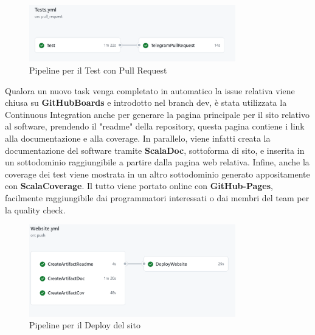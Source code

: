         \begin{figure}[H]
            \caption{Pipeline per il Test con Pull Request}
            \label{fig:CI-Test-PR}
            \centering
            \includegraphics[width=0.8\textwidth]{Images/CI-Test-PR.png}
        \end{figure}

        Qualora un nuovo task venga completato in automatico la issue relativa viene chiusa su \textbf{GitHubBoards} e introdotto nel branch dev, è stata utilizzata la Continuous Integration anche per generare la pagina principale per il sito relativo al software, prendendo il "readme" della repository, questa pagina contiene i link alla documentazione e alla coverage. In parallelo, viene infatti creata la documentazione del software tramite \textbf{ScalaDoc}, sottoforma di sito, e inserita in un sottodominio raggiungibile a partire dalla pagina web relativa. Infine, anche la coverage dei test viene mostrata in un altro sottodominio generato appositamente con \textbf{ScalaCoverage}. Il tutto viene portato online con \textbf{GitHub-Pages}, facilmente raggiungibile dai programmatori interessati o dai membri del team per la quality check.
        \begin{figure}[H]
            \caption{Pipeline per il Deploy del sito}
            \label{CI-Website}
            \centering
            \includegraphics[width=0.8\textwidth]{Images/CI-Website.png}
        \end{figure}
        
